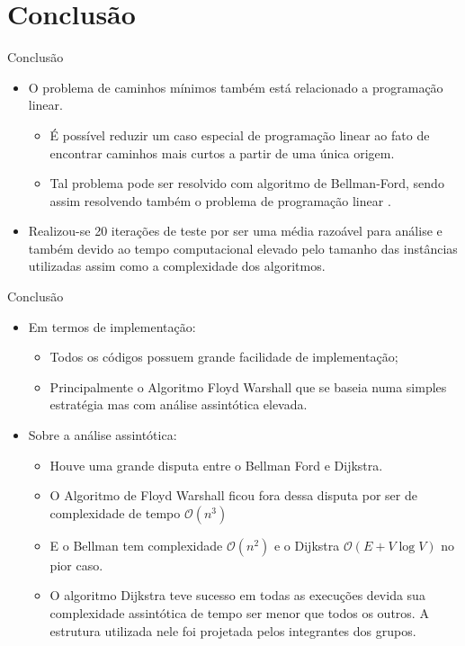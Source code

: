 \documentclass{beamer}
\begin{document}
\section{Conclusão}
	\begin{frame}{Conclusão}
		\begin{itemize}
			\item O problema de caminhos mínimos também está relacionado a programação linear.
			\begin{itemize}
				\item É possível reduzir um caso especial de programação linear ao fato de encontrar caminhos mais curtos a partir de uma única origem.
				
				\item Tal problema pode ser resolvido com algoritmo de Bellman-Ford, sendo assim resolvendo também o problema de programação linear \cite{cormen2002algoritmos}.
			\end{itemize}
			
			\item Realizou-se 20 iterações de teste por ser uma média razoável para análise e também devido ao tempo computacional elevado pelo tamanho das instâncias utilizadas assim como a complexidade dos algoritmos. 
			
		\end{itemize}
	\end{frame}
	
	\begin{frame}{Conclusão}
		\begin{itemize}
			\item Em termos de implementação:
			\begin{itemize}
				\item Todos os códigos possuem grande facilidade de implementação;
				
				\item Principalmente o Algoritmo Floyd Warshall que se baseia numa simples estratégia mas com análise assintótica elevada.
			\end{itemize}
			
			\item Sobre a análise assintótica:
			\begin{itemize}
				\item Houve uma grande disputa entre o Bellman Ford e Dijkstra. 
				
				\item O Algoritmo de Floyd Warshall ficou fora dessa disputa por ser de complexidade de tempo  $\mathcal{O}(n^3)$
				
				\item E o Bellman tem complexidade  $\mathcal{O}(n^2)$ e o Dijkstra $\mathcal{O}(E + V \log V)$ no pior caso. 
				
				\item O algoritmo Dijkstra teve sucesso em todas as execuções devida sua complexidade assintótica de tempo ser menor que todos os outros. A estrutura utilizada nele foi projetada pelos integrantes dos grupos.
			\end{itemize}
		\end{itemize}
	\end{frame}
\end{document}
